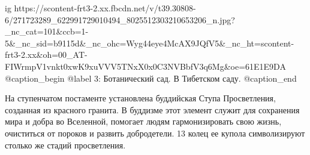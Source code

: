  
 
 
 
 

\ifcmt
  ig https://scontent-frt3-2.xx.fbcdn.net/v/t39.30808-6/271723289_622991729010494_8025512303210653206_n.jpg?_nc_cat=101&ccb=1-5&_nc_sid=b9115d&_nc_ohc=Wyg44eye4McAX9JQfV5&_nc_ht=scontent-frt3-2.xx&oh=00_AT-FIWrmpV1vnkt0xwK9xuVVV5TNxX0x0C3NVBbfV3q6Mg&oe=61E1E9DA
	@caption_begin
		@label 3: Ботанический сад. В Тибетском саду.  
	@caption_end
\fi

На ступенчатом постаменте установлена буддийская Ступа Просветления, созданная
из красного гранита. В буддизме этот элемент служит для сохранения мира и добра
во Вселенной, помогает людям гармонизировать свою жизнь, очиститься от пороков
и развить добродетели. 13 колец ее купола символизируют столько же стадий
просветления.
